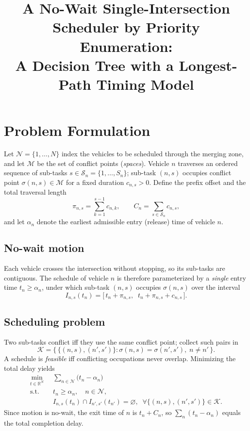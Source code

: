 \documentclass[12pt]{article}
\title{A No-Wait Single-Intersection Scheduler by Priority Enumeration:\\
A Decision Tree with a Longest-Path Timing Model}
\author{}\date{}
\begin{document}
\maketitle

\section{Problem Formulation}\label{sec:form}

Let $\mathcal{N}=\{1,\dots,N\}$ index the vehicles to be scheduled through the
merging zone, and let $\mathcal{M}$ be the set of conflict points (\emph{spaces}).
Vehicle $n$ traverses an ordered sequence of sub-tasks
$s\in\mathcal{S}_n=\{1,\dots,S_n\}$; sub-task $(n,s)$ occupies conflict point
$\sigma(n,s)\in\mathcal{M}$ for a fixed duration $c_{n,s}>0$. Define the prefix
offset and the total traversal length
\begin{equation}
\pi_{n,s}=\sum_{k=1}^{s-1}c_{n,k},\qquad
C_{n}=\sum_{s\in\mathcal{S}_n}c_{n,s},
\end{equation}
and let $\alpha_n$ denote the earliest admissible entry (release) time of
vehicle $n$.

\subsection{No-wait motion}
Each vehicle crosses the intersection without stopping, so its sub-tasks are
contiguous. The schedule of vehicle $n$ is therefore parameterized by a
\emph{single} entry time $t_n\ge\alpha_n$, under which sub-task $(n,s)$ occupies
$\sigma(n,s)$ over the interval
\begin{equation}
I_{n,s}(t_n)=\bigl[\,t_n+\pi_{n,s},\;\; t_n+\pi_{n,s}+c_{n,s}\,\bigr].
\end{equation}

\subsection{Scheduling problem}
Two sub-tasks conflict iff they use the same conflict point; collect such pairs in
\begin{equation}
\mathcal{K}=\bigl\{\,\{(n,s),(n',s')\}:\sigma(n,s)=\sigma(n',s'),\;n\neq n'\,\bigr\}.
\end{equation}
A schedule is \emph{feasible} iff conflicting occupations never overlap.
Minimizing the total delay yields
\begin{equation}\tag{P}\label{eq:P}
\begin{aligned}
\min_{t\in\mathbb{R}^{N}}\;\; & \sum_{n\in\mathcal{N}}\bigl(t_n-\alpha_n\bigr)\\
\text{s.t.}\;\; & t_n\ge\alpha_n,\quad n\in\mathcal{N},\\
& I_{n,s}(t_n)\cap I_{n',s'}(t_{n'})=\varnothing,
\;\;\forall\{(n,s),(n',s')\}\in\mathcal{K}.
\end{aligned}
\end{equation}
Since motion is no-wait, the exit time of $n$ is $t_n+C_n$, so
$\sum_n(t_n-\alpha_n)$ equals the total completion delay.
\end{document}
